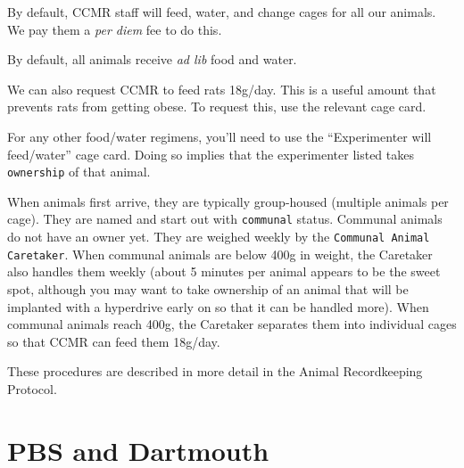 \documentclass{tufte-book}
\newcommand{\doccls}[1]{\texttt{#1}}%
\begin{document}
By default, CCMR staff will feed, water, and change cages for all our
animals. We pay them a {\it per diem} fee to do this.

By default, all animals receive {\it ad lib} food and water. 

We can also request CCMR to feed rats 18g/day. This is a useful amount
that prevents rats from getting obese. To request this, use the
relevant cage card.

For any other food/water regimens, you'll need to use the
``Experimenter will feed/water'' cage card. Doing so implies that the
experimenter listed takes \doccls{ownership} of that animal.

When animals first arrive, they are typically group-housed (multiple
animals per cage). They are named and start out with \doccls{communal}
status. Communal animals do not have an owner yet. They are weighed
weekly by the \doccls{Communal Animal Caretaker}. When communal animals are below 400g
in weight, the Caretaker also handles them weekly (about 5 minutes per
animal appears to be the sweet spot, although you may want to take
ownership of an animal that will be implanted with a hyperdrive early
on so that it can be handled more). When communal animals reach 400g,
the Caretaker separates them into individual cages so that CCMR can
feed them 18g/day.

These procedures are described in more detail in the Animal
Recordkeeping Protocol.

\chapter{PBS and Dartmouth}
\end{document}
